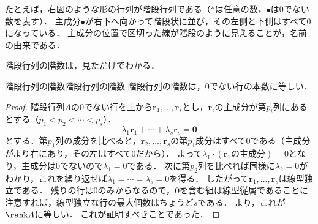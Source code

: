 \noindent
\begin{minipage}[c]{0.52\linewidth}
  たとえば，右図のような形の行列が階段行列である（$\ast$は任意の数，$\bullet$は$0$でない数を表す）．
  主成分$\bullet$が右下へ向かって階段状に並び，その左側と下側はすべて$0$になっている．
  主成分の位置で区切った線が階段のように見えることが，名前の由来である．
\end{minipage}%
\hfill
\begin{minipage}[c]{0.44\linewidth}
  \centering
  \label{fig:echelon}
\end{minipage}
\par\medskip

階段行列の階数は，見ただけでわかる．

\begin{prop}{階段行列の階数}{階段行列の階数}
  階段行列の階数は，$0$でない行の本数に等しい．
\end{prop}

\begin{tleftbar}
\begin{proof}
  階段行列$A$の$0$でない行を上から$\bm{r}_1, \dots, \bm{r}_s$とし，$\bm{r}_i$の主成分が第$p_i$列にあるとする（$p_1 < p_2 < \cdots < p_s$）．
  \[
    \lambda_1 \bm{r}_1 + \cdots + \lambda_s \bm{r}_s = \bm{0}
  \]
  とする．第$p_1$列の成分を比べると，$\bm{r}_2, \dots, \bm{r}_s$の第$p_1$成分はすべて$0$である（主成分がより右にあり，その左はすべて$0$だから）．
  よって$\lambda_1 \cdot (\bm{r}_1 \text{の主成分}) = 0$となり，主成分は$0$でないので$\lambda_1 = 0$である．
  次に第$p_2$列を比べれば同様に$\lambda_2 = 0$がわかり，これを繰り返せば$\lambda_1 = \cdots = \lambda_s = 0$を得る．
  したがって$\bm{r}_1, \dots, \bm{r}_s$は線型独立である．
  残りの行は$0$のみからなるので，$\bm{0}$を含む組は線型従属であることに注意すれば，線型独立な行の最大個数はちょうど$s$である．
  より，これが$\rank A$に等しい．
  これが証明すべきことであった．
\end{proof}
\end{tleftbar}

